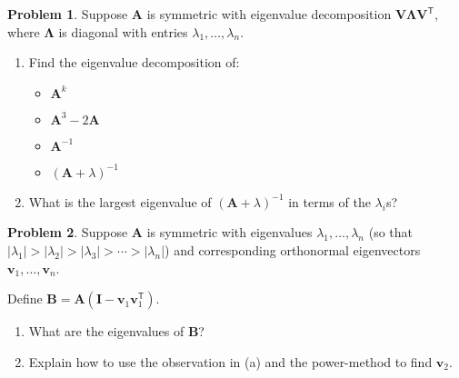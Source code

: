 \documentclass[12pt]{article}
\theoremstyle{definition}
\newtheorem{problem}{Problem}
\renewcommand{\vec}{\mathbf}
\newcommand{\T}{\mathsf{T}}
\begin{document}
\begin{problem}
Suppose $\vec{A}$ is symmetric with eigenvalue decomposition $\vec{V}\vec{\Lambda}\vec{V}^\T$, where $\vec{\Lambda}$ is diagonal with entries $\lambda_1, \ldots, \lambda_n$.

\begin{enumerate}
    \item 
Find the eigenvalue decomposition of:
\begin{itemize}
\item $\vec{A}^k$    
\item $\vec{A}^3 -2 \vec{A}$
\item $\vec{A}^{-1}$
\item $(\vec{A}+\lambda)^{-1}$
\end{itemize}
\item What is the largest eigenvalue of $(\vec{A}+\lambda)^{-1}$ in terms of the $\lambda_i$s?
\end{enumerate}
\end{problem}


\begin{problem}
    Suppose $\vec{A}$ is symmetric with eigenvalues $\lambda_1, \ldots, \lambda_n$ (so that $|\lambda_1| > |\lambda_2| > |\lambda_3| > \cdots > |\lambda_n|$) and corresponding orthonormal eigenvectors $\vec{v}_1, \ldots, \vec{v}_n$.

    Define $\vec{B} = \vec{A}(\vec{I} - \vec{v}_1\vec{v}_1^\T)$. 

    \begin{enumerate}
        \item What are the eigenvalues of $\vec{B}$?

        \item Explain how to use the observation in (a) and the power-method to find $\vec{v}_2$.

    \end{enumerate}

\end{problem}
\end{document}
